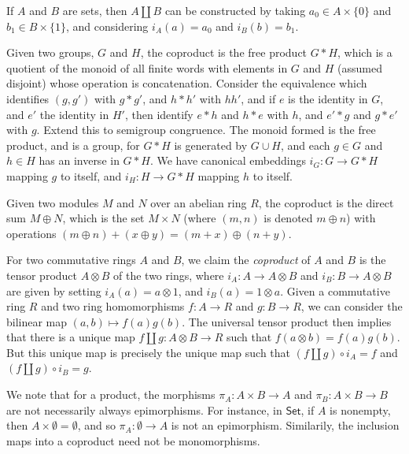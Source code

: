 \begin{example}
    If $A$ and $B$ are sets, then $A \amalg B$ can be constructed by taking $a_0 \in A \times \{ 0 \}$ and $b_1 \in B \times \{ 1 \}$, and considering $i_A(a) = a_0$ and $i_B(b) = b_1$. 
\end{example}

\begin{example}
    Given two groups, $G$ and $H$, the coproduct is the free product $G * H$, which is a quotient of the monoid of all finite words with elements in $G$ and $H$ (assumed disjoint) whose operation is concatenation. Consider the equivalence which identifies $(g,g')$ with $g * g'$, and $h * h'$ with $hh'$, and if $e$ is the identity in $G$, and $e'$ the identity in $H'$, then identify $e * h$ and $h * e$ with $h$, and $e' * g$ and $g * e'$ with $g$. Extend this to semigroup congruence. The monoid formed is the free product, and is a group, for $G * H$ is generated by $G \cup H$, and each $g \in G$ and $h \in H$ has an inverse in $G * H$. We have canonical embeddings $i_G: G \to G * H$ mapping $g$ to itself, and $i_H: H \to G * H$ mapping $h$ to itself.
\end{example}

\begin{example}
    Given two modules $M$ and $N$ over an abelian ring $R$, the coproduct is the direct sum $M \oplus N$, which is the set $M \times N$ (where $(m,n)$ is denoted $m \oplus n$) with operations $(m \oplus n) + (x \oplus y) = (m + x) \oplus (n + y)$.
\end{example}

\begin{example}
    For two commutative rings $A$ and $B$, we claim the \emph{coproduct} of $A$ and $B$ is the tensor product $A \otimes B$ of the two rings, where $i_A: A \to A \otimes B$ and $i_B: B \to A \otimes B$ are given by setting $i_A(a) = a \otimes 1$, and $i_B(a) = 1 \otimes a$. Given a commutative ring $R$ and two ring homomorphisms $f: A \to R$ and $g: B \to R$, we can consider the bilinear map $(a,b) \mapsto f(a)g(b)$. The universal tensor product then implies that there is a unique map $f \amalg g: A \otimes B \to R$ such that $f(a \otimes b) = f(a)g(b)$. But this unique map is precisely the unique map such that $(f \amalg g) \circ i_A = f$ and $(f \amalg g) \circ i_B = g$.
\end{example}

We note that for a product, the morphisms $\pi_A: A \times B \to A$ and $\pi_B : A \times B \to B$ are not necessarily always epimorphisms. For instance, in $\mathsf{Set}$, if $A$ is nonempty, then $A \times \emptyset = \emptyset$, and so $\pi_A: \emptyset \to A$ is not an epimorphism. Similarily, the inclusion maps into a coproduct need not be monomorphisms.

